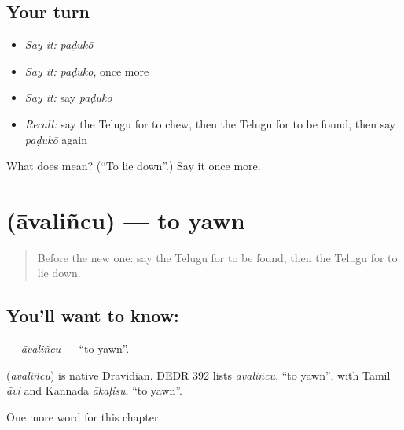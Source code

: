 \subsection*{Your turn}
\begin{itemize}
\raggedright
  \item \emph{Say it:} \emph{paḍukō}
  \item \emph{Say it:} \emph{paḍukō}, once more
  \item \emph{Say it:} say \emph{paḍukō}
  \item \emph{Recall:} say the Telugu for to chew, then the Telugu for to be found, then say \emph{paḍukō} again
\end{itemize}

\begin{tcolorbox}[breakable,colback=teal!4,colframe=teal!35!black,title={Before you move on}]
What does  mean? (\textquotedblleft{}To lie down\textquotedblright{}.) Say it once more.
\end{tcolorbox}
\section[\texorpdfstring{\te{ఆవలించు} (āvaliñcu)}{ఆవలించు (āvaliñcu)}]{ (āvaliñcu) — to yawn}

\label{lesson:TE-C201-avalincu}



\begin{quote}
Before the new one: say the Telugu for to be found, then the Telugu for to lie down.
\end{quote}

\subsection*{You'll want to know: }
\textbf{} — \emph{āvaliñcu} — \textquotedblleft{}to yawn\textquotedblright{}.

\begin{cousinweb}
\textbf{} (\emph{āvaliñcu}) is native Dravidian. DEDR 392 lists \emph{āvaliñcu}, \textquotedblleft{}to yawn\textquotedblright{}, with Tamil \emph{āvi} and Kannada \emph{ākaḷisu}, \textquotedblleft{}to yawn\textquotedblright{}.
\end{cousinweb}

\begin{grammarlens}[title={What you've built}]
One more word for this chapter.
\end{grammarlens}

